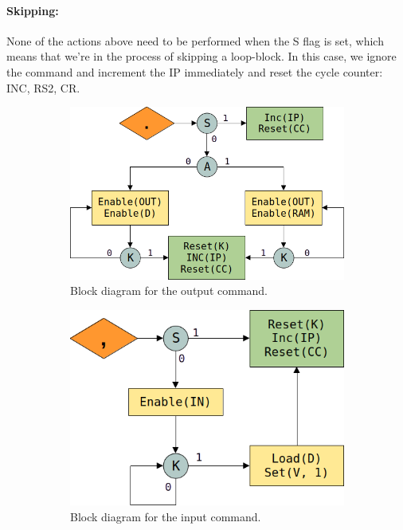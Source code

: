 \documentclass{article}
\begin{document}
\paragraph{Skipping:} None of the actions above need to be performed when the S flag is set, which means that we're in the process of skipping a loop-block. In this case, we ignore the command and increment the IP immediately and reset the cycle counter: INC, RS2, CR.

\begin{figure}[H]
  \centering
  \mbox{}\hfill
  \begin{subfigure}[t]{0.4\linewidth}
    \centering
    \includegraphics[scale=0.3]{img/outputalg}
    \caption{Block diagram for the output command.}
    \label{fig:inputbufalg}
  \end{subfigure}
  \hfill
  \begin{subfigure}[t]{0.4\linewidth}
    \centering
    \includegraphics[scale=0.3]{img/inputalg}
    \caption{Block diagram for the input command.}
    \label{fig:inputimalg}
  \end{subfigure}
  \hfill\mbox{}
  \caption{}
  \label{fig:inputalg}
\end{figure}
\end{document}
